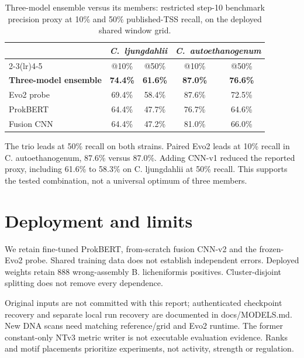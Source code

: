 \documentclass{article}
\begin{document}
\begin{table}[h]
\centering
\caption{Three-model ensemble versus its members: restricted step-10 benchmark precision proxy
at 10\% and 50\% published-TSS recall, on the deployed shared window grid.}
\label{tab:ensemble}
\begin{tabular}{lcccc}
\toprule
& \multicolumn{2}{c}{\emph{C.\ ljungdahlii}} & \multicolumn{2}{c}{\emph{C.\ autoethanogenum}} \\
\cmidrule(lr){2-3}\cmidrule(lr){4-5}
& @10\% & @50\% & @10\% & @50\% \\
\midrule
\textbf{Three-model ensemble} & \textbf{74.4\%} & \textbf{61.6\%} & \textbf{87.0\%} & \textbf{76.6\%} \\
Evo2 probe                    & 69.4\% & 58.4\% & 87.6\% & 72.5\% \\
ProkBERT                      & 64.4\% & 47.7\% & 76.7\% & 64.6\% \\
Fusion CNN                    & 64.4\% & 47.2\% & 81.0\% & 66.0\% \\
\bottomrule
\end{tabular}
\end{table}

The trio leads at 50\% recall on both strains. Paired Evo2 leads at 10\% recall in C. autoethanogenum, 87.6\% versus 87.0\%. Adding CNN-v1 reduced the reported proxy, including 61.6\% to 58.3\% on C. ljungdahlii at 50\% recall. This supports the tested combination, not a universal optimum of three members.

\section{Deployment and limits}
We retain fine-tuned ProkBERT, from-scratch fusion CNN-v2 and the frozen-Evo2 probe. Shared training data does not establish independent errors. Deployed weights retain 888 wrong-assembly B. licheniformis positives. Cluster-disjoint splitting does not remove every dependence.

Original inputs are not committed with this report; authenticated checkpoint recovery and separate local run recovery are documented in docs/MODELS.md. New DNA scans need matching reference/grid and Evo2 runtime. The former constant-only NTv3 metric writer is not executable evaluation evidence. Ranks and motif placements prioritize experiments, not activity, strength or regulation.
\end{document}
